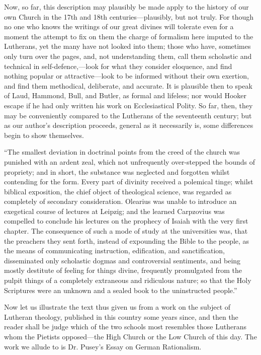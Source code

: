 Now, so far, this description may plausibly be made
apply to the history of our own Church in the 17th and 18th
centuries—plausibly, but not truly. For though no one who knows the
writings of our great divines will tolerate even for a moment the
attempt to fix on them the charge of formalism here imputed to the
Lutherans, yet the many have not looked into them; those who have,
sometimes only turn over the pages, and, not understanding them, call
them scholastic and technical in self-defence,—look for what they
consider eloquence, and find nothing popular or attractive—look to be
informed without their own exertion, and find them methodical,
deliberate, and accurate. It is plausible then to speak of Laud,
Hammond, Bull, and Butler, as formal and lifeless; nor would Hooker
escape if he had only written his work on Ecclesiastical Polity. So far,
then, they may be conveniently compared to the Lutherans of the
seventeenth century; but as our author's description proceeds, general
as it necessarily is, some differences begin to show themselves.

``The smallest deviation in doctrinal
points from the creed of the church was punished with an ardent zeal,
which not unfrequently over-stepped the bounds of propriety; and in
short, the substance was neglected and forgotten whilst contending for
the form. Every part of divinity received a polemical tinge; whilst
biblical exposition, the chief object of theological science, was
regarded as completely of secondary consideration. Olearius was unable
to introduce an exegetical course of lectures at Leipzig; and the
learned Carpzovius was compelled to conclude his lectures on the
prophecy of Isaiah with the very first chapter. The consequence of such
a mode of study at the universities was, that the preachers they sent
forth, instead of expounding the Bible to the people, as the means of
communicating instruction, edification, and sanctification, disseminated
only scholastic dogmas and controversial sentiments, and being mostly
destitute of feeling for things divine, frequently promulgated from the
pulpit things of a completely extraneous and ridiculous nature; so that
the Holy Scriptures were an unknown and a sealed book to the
uninstructed people.''

Now let us illustrate the text thus given us from a
work on the subject of Lutheran theology, published in this country some
years since, and then the reader shall be judge which of the two schools
most resembles those Lutherans whom the Pietists opposed—the High
Church or the Low Church of this day. The work we allude to is Dr. Pusey's
Essay on German Rationalism.

